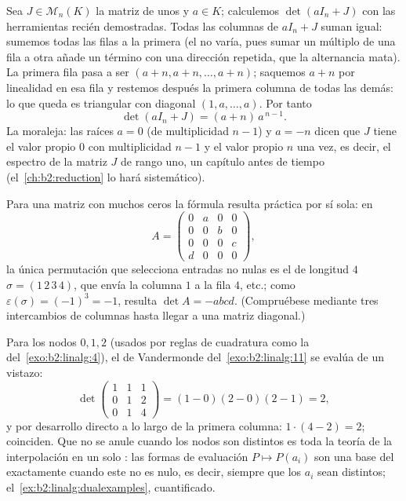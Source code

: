 \begin{example}\label{ex:b2:linalg:onesmatrix}
Sea $J \in \mathcal{M}_n(K)$ la matriz de unos y $a \in K$;
calculemos $\det(aI_n + J)$ con las herramientas recién
demostradas. Todas las columnas de $aI_n + J$ suman igual: sumemos
todas las filas a la primera (el  no varía, pues sumar
un múltiplo de una fila a otra añade un término con una dirección
repetida, que la alternancia mata). La primera fila pasa a ser $(a
+ n, a + n, \dots, a + n)$; saquemos $a + n$ por linealidad en esa
fila y restemos después la primera columna de todas las demás: lo
que queda es triangular con diagonal $(1, a, \dots, a)$. Por tanto
\[
\det(aI_n + J) = (a + n)\,a^{\,n-1}.
\]
La moraleja: las raíces $a = 0$ (de multiplicidad $n - 1$) y $a =
-n$ dicen que $J$ tiene el valor propio $0$ con multiplicidad $n -
1$ y el valor propio $n$ una vez, es decir, el espectro de la
matriz $J$ de rango uno, un capítulo antes de tiempo (el~\cref{ch:b2:reduction} lo hará sistemático).
\end{example}

\begin{example}\label{ex:b2:linalg:permexample}
Para una matriz con muchos ceros la fórmula resulta práctica por sí
sola: en
\[
A = \begin{pmatrix}
0 & a & 0 & 0\\
0 & 0 & b & 0\\
0 & 0 & 0 & c\\
d & 0 & 0 & 0
\end{pmatrix},
\]
la única permutación que selecciona entradas no nulas es el 
de longitud $4$ $\sigma = (1\,2\,3\,4)$, que envía la columna $1$ a
la fila $4$, etc.; como $\varepsilon(\sigma) = (-1)^3 = -1$, resulta
$\det A = -abcd$. (Compruébese mediante tres intercambios de
columnas hasta llegar a una matriz diagonal.)
\end{example}

\begin{example}\label{ex:b2:linalg:vandermondework}
Para los nodos $0, 1, 2$ (usados por reglas de cuadratura como la
del~\cref{exo:b2:linalg:4}), el  de Vandermonde del~\cref{exo:b2:linalg:11} se evalúa de un vistazo:
\[
\det\begin{pmatrix}
1 & 1 & 1\\
0 & 1 & 2\\
0 & 1 & 4
\end{pmatrix}
= (1 - 0)(2 - 0)(2 - 1) = 2 ,
\]
y por desarrollo directo a lo largo de la primera columna:
$1\cdot(4 - 2) = 2$; coinciden. Que no se anule cuando los nodos
son distintos es toda la teoría de la interpolación en un solo
: las formas de evaluación $P \mapsto P(a_i)$ son una
base del  exactamente cuando este  no es nulo, es
decir, siempre que los $a_i$ sean distintos; el~\cref{ex:b2:linalg:dualexamples}, cuantificado.
\end{example}

